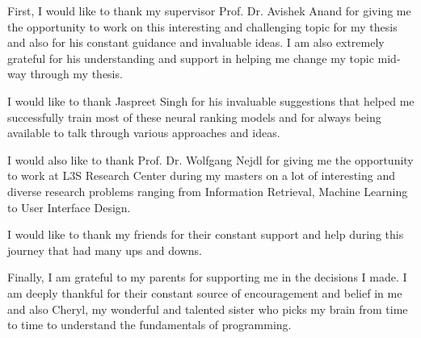 \documentclass[11pt, oneside]{Thesis} %
\begin{document}
{{First, I would like to thank my supervisor Prof. Dr. Avishek Anand for giving me the opportunity to work on this interesting and challenging topic for my thesis and also for his constant guidance and invaluable ideas. I am also extremely grateful for his understanding and support in helping me change my topic mid-way through my thesis.

I would like to thank Jaspreet Singh for his invaluable suggestions that helped me successfully  train most of these neural ranking models and for always being available to talk through various approaches and ideas. 

I would also like to thank Prof. Dr. Wolfgang Nejdl for giving me the opportunity to work at L3S Research Center during my masters on a lot of interesting and diverse research problems ranging from Information Retrieval, Machine Learning to User Interface Design.

I would like to thank my friends for their constant support and help during this journey that had many ups and downs. 

Finally, I am grateful to my parents for supporting me in the decisions I made. I am deeply thankful for their constant source of encouragement and belief in me and also Cheryl, my wonderful and talented sister who picks my brain from time to time to understand the fundamentals of programming.
}
\clearpage %


\pagestyle{fancy} %

\tableofcontents %


\listoffigures %

\listoftables %


\clearpage %


}
\end{document}
